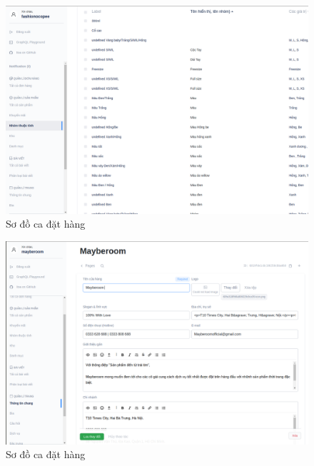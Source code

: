\begin{figure}[h!]
	\begin{center}	
		\includegraphics[width=\textwidth]{./results/attributes}
		\caption{Sơ đồ ca đặt hàng}
	\end{center}
\end{figure}

\begin{figure}[h!]
	\begin{center}	
		\includegraphics[width=\textwidth]{./results/store}
		\caption{Sơ đồ ca đặt hàng}
	\end{center}
\end{figure}

